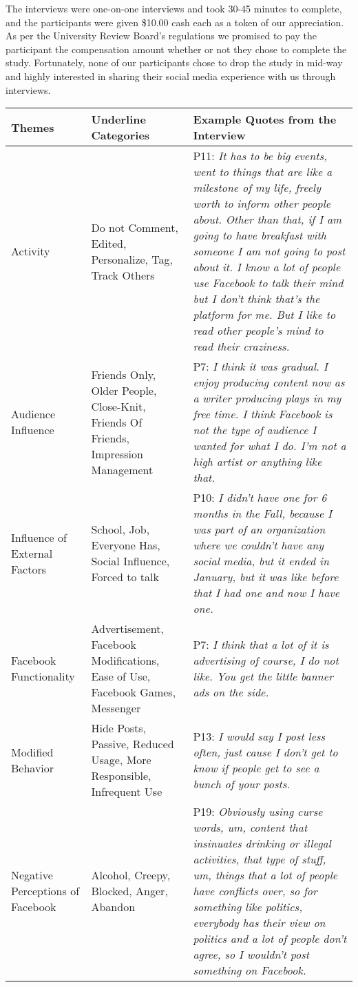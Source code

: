 The interviews were one-on-one interviews and took 30-45 minutes to complete, and the participants were given \$10.00 cash each as a token of our appreciation. As per the University Review Board's regulations we promised to pay the participant the compensation amount whether or not they chose to complete the study. Fortunately, none of our participants chose to drop the study in mid-way and highly interested in sharing their social media experience with us through interviews. 
\begin{table*}[h!]
\begin{tabular}{ |p{4cm}||p{4cm}|p{9cm}| }
 \hline
 Themes & Underline Categories & Example Quotes from the Interview\\
 \hline \hline
 Activity   & Do not Comment, Edited, Personalize, Tag, Track Others& P11: \textit{It has to be big events, went to things that are like a milestone of my life, freely worth to inform other people about. Other than that, if I am going to have breakfast with someone I am not going to post about it. I know a lot of people use Facebook to talk their mind but I don't think that's the platform for me. But I like to read other people's mind to read their craziness.}\\
 \hline
 Audience Influence &   Friends Only, Older People, Close-Knit, Friends Of Friends, Impression Management&P7: \textit{I think it was gradual. I enjoy producing content now as a writer producing plays in my free time. I think Facebook is not the type of audience I wanted for what I do. I'm not a high artist or anything like that.}\\
 \hline
 Influence of External Factors &School, Job, Everyone Has, Social Influence, Forced to talk& P10: \textit{I didn't have one for 6 months in the Fall, because I was part of an organization where we couldn't have any social media, but it ended in January, but it was like before that I had one and now I have one.} \\
 \hline
 Facebook Functionality &Advertisement, Facebook Modifications, Ease of Use, Facebook Games, Messenger& P7: \textit{I think that a lot of it is advertising of course, I do not like. You get the little banner ads on the side.}\\
 \hline
 Modified Behavior & Hide Posts, Passive, Reduced Usage, More Responsible, Infrequent Use& P13: \textit{I would say I post less often, just cause I don't get to know if people get to see a bunch of your posts.} \\
 \hline
 Negative Perceptions of Facebook    & Alcohol, Creepy, Blocked, Anger, Abandon&P19: \textit{Obviously using curse words, um, content that insinuates drinking or illegal activities, that type of stuff, um, things that a lot of people have conflicts over, so for something like politics, everybody has their view on politics and a lot of people don't agree, so I wouldn't post something on Facebook.}  \\

\end{tabular}
\end{table*}
